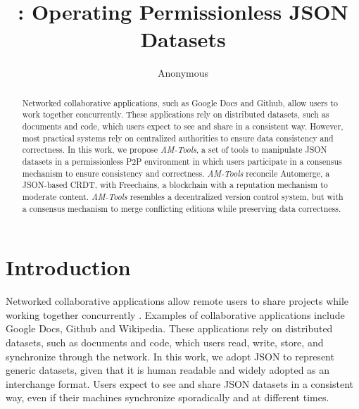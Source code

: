 \documentclass[12pt]{article}
\title{
    \AMT: Operating Permissionless JSON Datasets
}
\author{Anonymous}
\newcommand{\AMT}      {\emph{AM-Tools}\xspace}
\begin{document}

\maketitle

\begin{abstract}
Networked collaborative applications, such as Google Docs and Github, allow
users to work together concurrently.
These applications rely on distributed datasets, such as documents and code,
which users expect to see and share in a consistent way.
However, most practical systems rely on centralized authorities to ensure data
consistency and correctness.
%
In this work, we propose \AMT, a set of tools to manipulate JSON datasets in a
permissionless P2P environment in which users participate in a consensus
mechanism to ensure consistency and correctness.
%
\AMT reconcile Automerge, a JSON-based CRDT, with Freechains, a blockchain with
a reputation mechanism to moderate content.
%
\AMT resembles a decentralized version control system, but with a consensus
mechanism to merge conflicting editions while preserving data correctness.
\end{abstract}

\section{Introduction}
\label{sec.introduction}

Networked collaborative applications allow remote users to share projects while
working together concurrently \cite{wu2010partial}.
Examples of collaborative applications include Google Docs, Github and
Wikipedia.
%
These applications rely on distributed datasets, such as documents and code,
which users read, write, store, and synchronize through the network.
In this work, we adopt JSON to represent generic datasets, given that it is
human readable and widely adopted as an interchange format.
Users expect to see and share JSON datasets in a consistent way, even if their
machines synchronize sporadically and at different times.
\end{document}
